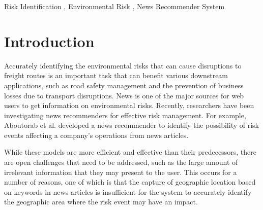 \documentclass[]{ceurart}
\begin{document}
\begin{keywords}
  Risk Identification \sep
  Environmental Risk \sep
  News Recommender System 
\end{keywords}

\maketitle
\section{Introduction}\label{1}
Accurately identifying the environmental risks that can cause disruptions to freight routes is an important task that can benefit various downstream applications, such as road safety management and the prevention of business losses due to transport disruptions. 
News is one of the major sources for web users to get information on environmental risks. 
Recently, researchers have been investigating news recommenders for effective risk management. For example, Aboutorab et al. \cite{aboutorab2021reinforcement} developed a news recommender to identify the possibility of risk events affecting a company's operations from news articles.

 While these models are more efficient and effective than their predecessors, there are open challenges that need to be addressed, such as the large amount of irrelevant information that they may present to the user. This occurs for a number of reasons, one of which is that the capture of geographic location based on keywords in news articles is insufficient for the system to accurately identify the geographic area where the risk event may have an impact. 
\end{document}
